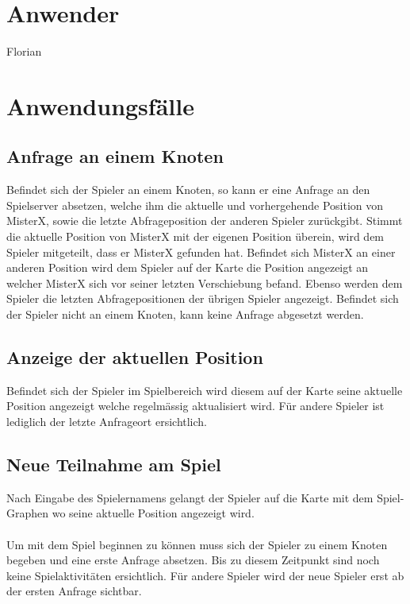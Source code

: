 \documentclass[11pt]{article}
\begin{document}
\section{Anwender}
Florian

\pagebreak
\section{Anwendungsfälle}
\subsection{Anfrage an einem Knoten}
Befindet sich der Spieler an einem Knoten, so kann er eine Anfrage an den Spielserver absetzen, welche ihm die aktuelle und vorhergehende Position von MisterX, sowie die letzte Abfrageposition der anderen Spieler zurückgibt. Stimmt die aktuelle Position von MisterX mit der eigenen Position überein, wird dem Spieler mitgeteilt, dass er MisterX gefunden hat. Befindet sich MisterX an einer anderen Position wird dem Spieler auf der Karte die Position angezeigt an welcher  MisterX sich vor seiner letzten Verschiebung befand. Ebenso werden dem Spieler die letzten Abfragepositionen der übrigen Spieler angezeigt.
Befindet sich der Spieler nicht an einem Knoten, kann keine Anfrage abgesetzt werden.

\subsection{Anzeige der aktuellen Position}
Befindet sich der Spieler im Spielbereich wird diesem auf der Karte seine aktuelle Position angezeigt welche regelmässig aktualisiert wird. Für andere Spieler ist lediglich der letzte Anfrageort ersichtlich.

\subsection{Neue Teilnahme am Spiel}
Nach Eingabe des Spielernamens gelangt der Spieler auf die Karte mit dem Spiel-Graphen wo seine aktuelle Position angezeigt wird.
\\\\
Um mit dem Spiel beginnen zu können muss sich der Spieler zu einem Knoten begeben und eine erste Anfrage absetzen. Bis zu diesem Zeitpunkt sind noch keine Spielaktivitäten ersichtlich.
Für andere Spieler wird der neue Spieler erst ab der ersten Anfrage sichtbar.
\end{document}
